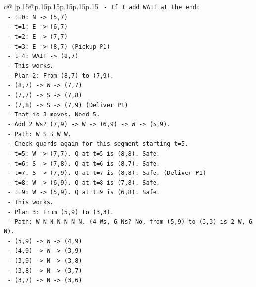 \documentclass{article}
\begin{document}
{\begin{supertabular}{c@{$\;$}|p{.15\linewidth}@{}p{.15\linewidth}p{.15\linewidth}p{.15\linewidth}p{.15\linewidth}p{.15\linewidth}}
{{{\texttt{       {-} If I add WAIT at the end:} \\
\texttt{         {-} t=0: N {-}> (5,7)} \\
\texttt{         {-} t=1: E {-}> (6,7)} \\
\texttt{         {-} t=2: E {-}> (7,7)} \\
\texttt{         {-} t=3: E {-}> (8,7) (Pickup P1)} \\
\texttt{         {-} t=4: WAIT {-}> (8,7)} \\
\texttt{       {-} This works.} \\
\texttt{     {-} Plan 2: From (8,7) to (7,9).} \\
\texttt{       {-} (8,7) {-}> W {-}> (7,7)} \\
\texttt{       {-} (7,7) {-}> S {-}> (7,8)} \\
\texttt{       {-} (7,8) {-}> S {-}> (7,9) (Deliver P1)} \\
\texttt{       {-} That is 3 moves. Need 5.} \\
\texttt{       {-} Add 2 Ws? (7,9) {-}> W {-}> (6,9) {-}> W {-}> (5,9).} \\
\texttt{       {-} Path: W S S W W.} \\
\texttt{       {-} Check guards again for this segment starting t=5.} \\
\texttt{       {-} t=5: W {-}> (7,7). Q at t=5 is (8,8). Safe.} \\
\texttt{       {-} t=6: S {-}> (7,8). Q at t=6 is (8,7). Safe.} \\
\texttt{       {-} t=7: S {-}> (7,9). Q at t=7 is (8,8). Safe. (Deliver P1)} \\
\texttt{       {-} t=8: W {-}> (6,9). Q at t=8 is (7,8). Safe.} \\
\texttt{       {-} t=9: W {-}> (5,9). Q at t=9 is (6,8). Safe.} \\
\texttt{       {-} This works.} \\
\texttt{     {-} Plan 3: From (5,9) to (3,3).} \\
\texttt{       {-} Path: W N N N N N N. (4 Ws, 6 Ns? No, from (5,9) to (3,3) is 2 W, 6 N).} \\
\texttt{       {-} (5,9) {-}> W {-}> (4,9)} \\
\texttt{       {-} (4,9) {-}> W {-}> (3,9)} \\
\texttt{       {-} (3,9) {-}> N {-}> (3,8)} \\
\texttt{       {-} (3,8) {-}> N {-}> (3,7)} \\
\texttt{       {-} (3,7) {-}> N {-}> (3,6)} \\
}}}
\end{supertabular}}
\end{document}
